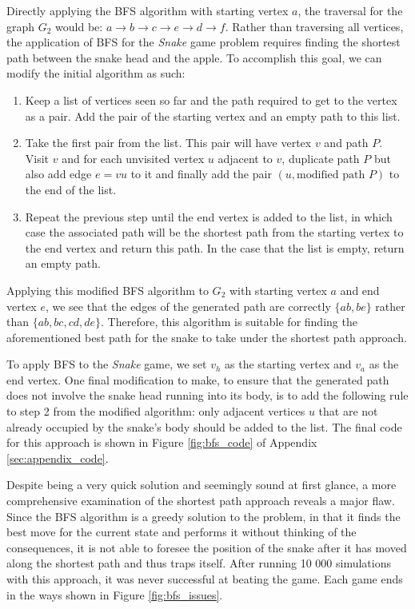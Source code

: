 \documentclass[12pt]{article}
\begin{document}
Directly applying the BFS algorithm with starting vertex $a$, the traversal for the graph $G_{2}$ would be: $a \rightarrow b \rightarrow c \rightarrow e \rightarrow d \rightarrow f$. Rather than traversing all vertices, the application of BFS for the \textit{Snake} game problem requires finding the shortest path between the snake head and the apple. To accomplish this goal, we can modify the initial algorithm as such:

\begin{enumerate}
	\item Keep a list of vertices seen so far and the path required to get to the vertex as a pair. Add the pair of the starting vertex and an empty path to this list.
	\item Take the first pair from the list. This pair will have vertex $v$ and path $P$. Visit $v$ and for each unvisited vertex $u$ adjacent to $v$, duplicate path $P$ but also add edge $e = vu$ to it and finally add the pair $(u, \textrm{modified path } P)$ to the end of the list.
	\item Repeat the previous step until the end vertex is added to the list, in which case the associated path will be the shortest path from the starting vertex to the end vertex and return this path. In the case that the list is empty, return an empty path.
\end{enumerate}

Applying this modified BFS algorithm to $G_{2} $ with starting vertex $a$ and end vertex $e$, we see that the edges of the generated path are correctly $\{ab, be\}$ rather than $\{ab, bc, cd, de\}$. Therefore, this algorithm is suitable for finding the aforementioned best path for the snake to take under the shortest path approach.

To apply BFS to the \textit{Snake} game, we set $v_{h}$ as the starting vertex and $v_{a}$ as the end vertex. One final modification to make, to ensure that the generated path does not involve the snake head running into its body, is to add the following rule to step 2 from the modified algorithm: only adjacent vertices $u$ that are not already occupied by the snake's body should be added to the list. The final code for this approach is shown in Figure \ref{fig:bfs_code} of Appendix \ref{sec:appendix_code}.

Despite being a very quick solution and seemingly sound at first glance, a more comprehensive examination of the shortest path approach reveals a major flaw. Since the BFS algorithm is a greedy solution to the problem, in that it finds the best move for the current state and performs it without thinking of the consequences, it is not able to foresee the position of the snake after it has moved along the shortest path and thus traps itself. After running 10 000 simulations with this approach, it was never successful at beating the game. Each game ends in the ways shown in Figure \ref{fig:bfs_issues}.
\end{document}
